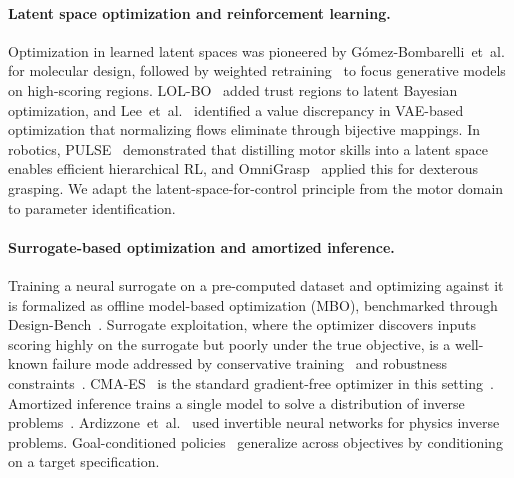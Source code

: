 \paragraph{Latent space optimization and reinforcement learning.}
Optimization in learned latent spaces was pioneered by G\'{o}mez-Bombarelli~et~al.~\cite{gomez2018automatic} for molecular design, followed by weighted retraining~\cite{tripp2020sample} to focus generative models on high-scoring regions. LOL-BO~\cite{maus2022lolbo} added trust regions to latent Bayesian optimization, and Lee~et~al.~\cite{lee2025nfbo} identified a value discrepancy in VAE-based optimization that normalizing flows eliminate through bijective mappings. In robotics, PULSE~\cite{luo2024pulse} demonstrated that distilling motor skills into a latent space enables efficient hierarchical RL, and OmniGrasp~\cite{luo2024omnigrasp} applied this for dexterous grasping. We adapt the latent-space-for-control principle from the motor domain to parameter identification.

\paragraph{Surrogate-based optimization and amortized inference.}
Training a neural surrogate on a pre-computed dataset and optimizing against it is formalized as offline model-based optimization (MBO), benchmarked through Design-Bench~\cite{trabucco2022designbench}. Surrogate exploitation, where the optimizer discovers inputs scoring highly on the surrogate but poorly under the true objective, is a well-known failure mode addressed by conservative training~\cite{trabucco2021coms} and robustness constraints~\cite{yu2021roma}. CMA-ES~\cite{hansen2001cmaes} is the standard gradient-free optimizer in this setting~\cite{fischer2024zerograds}. Amortized inference trains a single model to solve a distribution of inverse problems~\cite{cranmer2020frontier, amos2023tutorial}. Ardizzone~et~al.~\cite{ardizzone2019inn} used invertible neural networks for physics inverse problems. Goal-conditioned policies~\cite{schaul2015universal} generalize across objectives by conditioning on a target specification.
